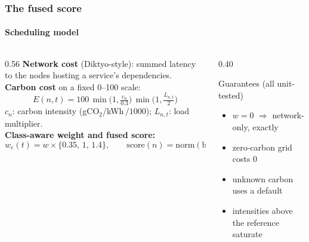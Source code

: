 \documentclass[aspectratio=169,11pt]{beamer}
\begin{document}
\begin{frame}[t]
\frametitle{The fused score}
\framesubtitle{Scheduling model}
\begin{columns}[T]
\begin{column}{0.56\textwidth}
\small
\textbf{Network cost} (Diktyo-style): summed latency to the nodes hosting a service's dependencies.\\[3pt]
\textbf{Carbon cost} on a fixed 0--100 scale:
\[ E(n,t)=100\,\min\!\Big(1,\tfrac{c_n}{0.3}\Big)\,\min\!\Big(1,\tfrac{L_{n,t}}{2}\Big) \]
$c_n$: carbon intensity (gCO$_2$/kWh$\,/1000$); $L_{n,t}$: load multiplier.\\[3pt]
\textbf{Class-aware weight and fused score:}
\[ w_e(t)=w\times\{0.35,\,1,\,1.4\},\qquad \mathrm{score}(n)=\mathrm{norm}(\mathrm{base})+w_e(t)\,E \]
\end{column}
\begin{column}{0.40\textwidth}
\begin{block}{Guarantees (all unit-tested)}
\small
\begin{itemize}
\item $w=0$ $\Rightarrow$ network-only, exactly
\item zero-carbon grid costs 0
\item unknown carbon uses a default
\item intensities above the reference saturate
\end{itemize}
\end{block}
\end{column}
\end{columns}
\end{frame}
\end{document}
